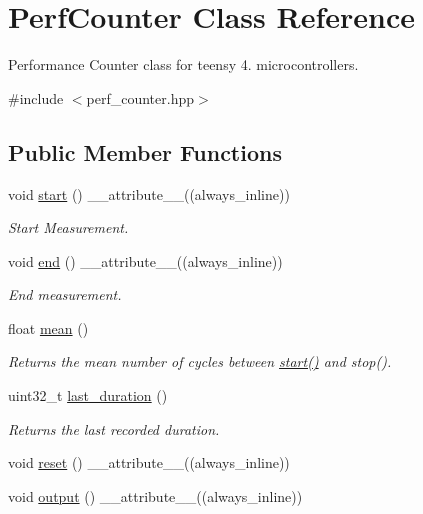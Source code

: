 \hypertarget{classPerfCounter}{}\section{Perf\+Counter Class Reference}
\label{classPerfCounter}


Performance Counter class for teensy 4. microcontrollers.  




{\ttfamily \#include $<$perf\+\_\+counter.\+hpp$>$}

\subsection*{Public Member Functions}
\begin{DoxyCompactItemize}
\item 
void \hyperlink{classPerfCounter_a5fdd73c1d604decd6dc745aada8092d1}{start} () \+\_\+\+\_\+attribute\+\_\+\+\_\+((always\+\_\+inline))
\begin{DoxyCompactList}\small\item\em Start Measurement. \end{DoxyCompactList}\item 
void \hyperlink{classPerfCounter_ab5d9f05bb15139451eaa857989ed8bd8}{end} () \+\_\+\+\_\+attribute\+\_\+\+\_\+((always\+\_\+inline))
\begin{DoxyCompactList}\small\item\em End measurement. \end{DoxyCompactList}\item 
float \hyperlink{classPerfCounter_a5992367178f424e486a7709659e276a6}{mean} ()
\begin{DoxyCompactList}\small\item\em Returns the mean number of cycles between {\ttfamily \hyperlink{classPerfCounter_a5fdd73c1d604decd6dc745aada8092d1}{start()}} and {\ttfamily stop()}. \end{DoxyCompactList}\item 
uint32\+\_\+t \hyperlink{classPerfCounter_a5239f46d98a619e0145f09320052bfc8}{last\+\_\+duration} ()
\begin{DoxyCompactList}\small\item\em Returns the last recorded duration. \end{DoxyCompactList}\item 
void \hyperlink{classPerfCounter_a60f7428eabd82437280b662d6829e184}{reset} () \+\_\+\+\_\+attribute\+\_\+\+\_\+((always\+\_\+inline))
\item 
void \hyperlink{classPerfCounter_a291ce8187d35e1f97a68339fe51931a4}{output} () \+\_\+\+\_\+attribute\+\_\+\+\_\+((always\+\_\+inline))
\end{DoxyCompactItemize}
